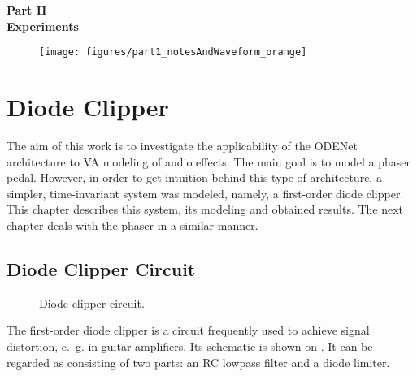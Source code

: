 \cleardoublepage
\thispagestyle{empty}
\begin{center}
\vspace*{3cm}
{\huge \bf Part II}\\ \vspace*{1cm}
{\Huge \bf Experiments}\\\vspace*{0.2cm}
\begin{figure}[ht]
\centering
\texttt{[image: figures/part1\_notesAndWaveform\_orange]}
\end{figure}
\end{center}
\label{par:part2}
\newpage
\quad
\thispagestyle{empty}
\newpage

\chapter{Diode Clipper}
\label{chap:diode_clipper}
The aim of this work is to investigate the applicability of the ODENet architecture to \ac{VA} modeling of audio effects. The main goal is to model a phaser pedal. However, in order to get intuition behind this type of architecture, a simpler, time-invariant system was modeled, namely, a first-order diode clipper. This chapter describes this system, its modeling and obtained results. The next chapter deals with the phaser in a similar manner.

\section{Diode Clipper Circuit}
\label{subsec:diode_clipper_intro}
\begin{figure}
  \centering
  
  \caption{Diode clipper circuit.}
  \label{fig:diode_clipper_circuit}
\end{figure}

The first-order diode clipper is a circuit frequently used to achieve signal distortion, e.\ g. in guitar amplifiers. Its schematic is shown on . It can be regarded as consisting of two parts: an RC lowpass filter and a diode limiter.

